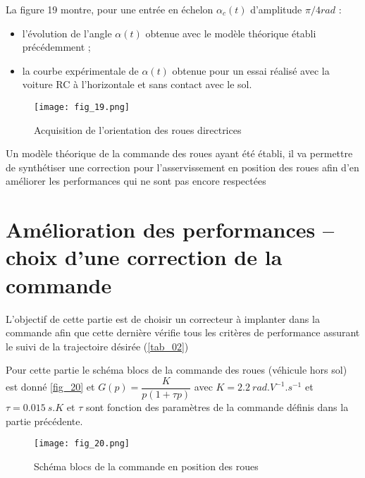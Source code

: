 La figure 19 montre, pour une entrée en échelon  $\alpha_c(t)$ d’amplitude $\pi/4 \si{rad}$ :
\begin{itemize}
\item l’évolution de l’angle $\alpha(t)$ obtenue avec le modèle théorique établi précédemment ;
\item la courbe expérimentale de $\alpha(t)$ obtenue pour un essai réalisé avec la voiture RC à l’horizontale et sans contact avec le sol.
\end{itemize}

\begin{figure}[H]
\centering
\texttt{[image: fig\_19.png]}
\caption{Acquisition de l’orientation des roues directrices \label{fig_19}}
\end{figure}

\ifprof
\begin{corrige}
\end{corrige}
\else
\fi

Un modèle théorique de la commande des roues ayant été établi, il va permettre de synthétiser une correction
pour l’asservissement en position des roues afin d’en améliorer les performances qui ne sont pas encore respectées

\section{Amélioration des performances  -- choix d’une correction de la
commande}
\begin{obj}
L’objectif de cette partie est de choisir un correcteur à implanter dans la commande afin que cette
dernière vérifie tous les critères de performance assurant le suivi de la trajectoire désirée (\autoref{tab_02})
\end{obj}

Pour cette partie le schéma blocs de la commande des roues (véhicule hors sol) est donné \autoref{fig_20} et $G(p) = \dfrac{K}{p\left(1+\tau p\right)}$  avec $K = \SI{2,2}{rad.V^{-1}.s^{-1}}$ et $\tau = \SI{0,015}{s}$.$K$ et $\tau$ sont fonction des paramètres de la commande définis dans la partie précédente.


\begin{figure}[H]
\centering
\texttt{[image: fig\_20.png]}
\caption{Schéma blocs de la commande en position des roues \label{fig_20}}
\end{figure}


